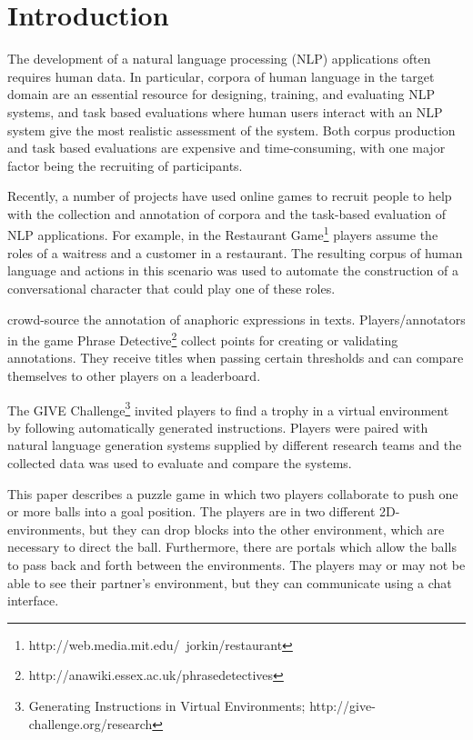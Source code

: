 
\section{Introduction}

The development of a natural language processing (NLP) applications
often requires human data. In particular, corpora of human language in
the target domain are an essential resource for designing, training,
and evaluating NLP systems, and task based evaluations where human
users interact with an NLP system give the most realistic assessment
of the system. Both corpus production and task based evaluations are
expensive and time-consuming, with one major factor being the
recruiting of participants.

Recently, a number of projects have used online games to recruit
people to help with the collection and annotation of corpora and the
task-based evaluation of NLP applications.  For example, in the
Restaurant Game\footnote{http://web.media.mit.edu/~jorkin/restaurant}
\cite{orkin-roy-2007} players assume the roles of a waitress and a customer
in a restaurant. The resulting corpus of human language and actions in
this scenario was used to automate the construction of a
conversational character that could play one of these roles.

 crowd-source the annotation of anaphoric
expressions in texts. Players/annotators in the game Phrase
Detective\footnote{http://anawiki.essex.ac.uk/phrasedetectives}
collect points for creating or validating annotations. They receive
titles when passing certain thresholds and can compare themselves to
other players on a leaderboard. 

The GIVE Challenge\footnote{Generating Instructions in Virtual
  Environments; http://give-challenge.org/research}
\cite{koller-etal-2010-give1-book,striegnitz-etal-2011-give25} invited
players to find a trophy in a virtual environment by following
automatically generated instructions. Players were paired with natural
language generation systems supplied by different research teams and
the collected data was used to evaluate and compare the systems.

This paper describes a puzzle game in which two players collaborate to
push one or more balls into a goal position. The players are in two
different 2D-environments, but they can drop blocks into the other
environment, which are necessary to direct the ball. Furthermore,
there are portals which allow the balls to pass back and forth between
the environments. The players may or may not be able to see their
partner's environment, but they can communicate using a chat
interface.

